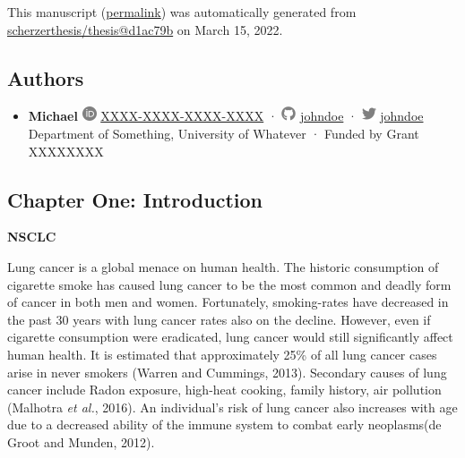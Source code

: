 This manuscript
(\href{https://scherzerthesis.github.io/thesis/v/d1ac79b39eca2a98ddaf51e9083282c9a05eaed3/}{permalink})
was automatically generated
from \href{https://github.com/scherzerthesis/thesis/tree/d1ac79b39eca2a98ddaf51e9083282c9a05eaed3}{scherzerthesis/thesis@d1ac79b}
on March 15, 2022.

\hypertarget{authors}{%
\subsection{Authors}\label{authors}}

\begin{itemize}
\tightlist
\item
  \textbf{Michael}
  \includegraphics[width=0.16667in,height=0.16667in]{images/orcid.svg}
  \href{https://orcid.org/XXXX-XXXX-XXXX-XXXX}{XXXX-XXXX-XXXX-XXXX}
  · \includegraphics[width=0.16667in,height=0.16667in]{images/github.svg}
  \href{https://github.com/johndoe}{johndoe}
  · \includegraphics[width=0.16667in,height=0.16667in]{images/twitter.svg}
  \href{https://twitter.com/johndoe}{johndoe}
  Department of Something, University of Whatever
  · Funded by Grant XXXXXXXX
\end{itemize}

\hypertarget{chapter-one-introduction}{%
\subsection{Chapter One: Introduction}\label{chapter-one-introduction}}

\textbf{NSCLC}

Lung cancer is a global menace on human health. The historic consumption of cigarette smoke has caused lung cancer to be the most common and deadly form of cancer in both men and women. Fortunately, smoking-rates have decreased in the past 30 years with lung cancer rates also on the decline. However, even if cigarette consumption were eradicated, lung cancer would still significantly affect human health. It is estimated that approximately 25\% of all lung cancer cases arise in never smokers (Warren and Cummings, 2013). Secondary causes of lung cancer include Radon exposure, high-heat cooking, family history, air pollution (Malhotra \emph{et al.}, 2016). An individual's risk of lung cancer also increases with age due to a decreased ability of the immune system to combat early neoplasms(de Groot and Munden, 2012).

